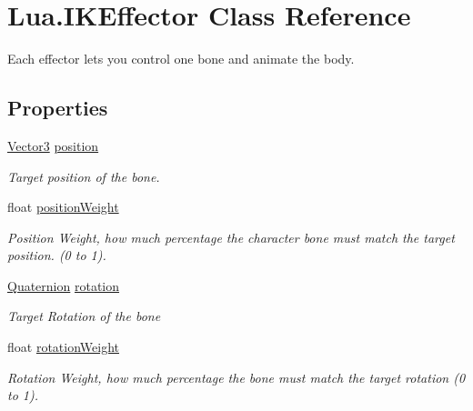\hypertarget{class_lua_1_1_i_k_effector}{}\section{Lua.\+I\+K\+Effector Class Reference}
\label{class_lua_1_1_i_k_effector}


Each effector lets you control one bone and animate the body.  


\subsection*{Properties}
\begin{DoxyCompactItemize}
\item 
\mbox{\hyperlink{class_lua_1_1_vector3}{Vector3}} \mbox{\hyperlink{class_lua_1_1_i_k_effector_a8fca3762ba9e4b8e90d21f7bd701048a}{position}}
\begin{DoxyCompactList}\small\item\em Target position of the bone. \end{DoxyCompactList}\item 
float \mbox{\hyperlink{class_lua_1_1_i_k_effector_a9237f631ddbe3043a8be096d4a51a5dd}{position\+Weight}}
\begin{DoxyCompactList}\small\item\em Position Weight, how much percentage the character bone must match the target position. (0 to 1). \end{DoxyCompactList}\item 
\mbox{\hyperlink{class_lua_1_1_quaternion}{Quaternion}} \mbox{\hyperlink{class_lua_1_1_i_k_effector_adb93ca27f68dbfc04d70e0df9f285210}{rotation}}
\begin{DoxyCompactList}\small\item\em Target Rotation of the bone \end{DoxyCompactList}\item 
float \mbox{\hyperlink{class_lua_1_1_i_k_effector_a1c101608c632fc144c0a098fc3a37986}{rotation\+Weight}}
\begin{DoxyCompactList}\small\item\em Rotation Weight, how much percentage the bone must match the target rotation (0 to 1). \end{DoxyCompactList}\end{DoxyCompactItemize}


